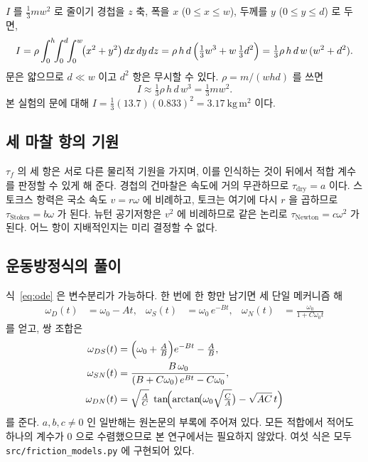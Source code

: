 \documentclass[11pt,letterpaper]{article}
\begin{document}
\begin{equationbreakdown}{$I$ 를 $\tfrac{1}{3}mw^2$ 로 줄이기}
경첩을 $z$ 축, 폭을 $x$ ($0\le x\le w$), 두께를 $y$ ($0\le y\le d$) 로 두면,
\begin{equation*}
I=\rho\int_0^h\!\!\int_0^d\!\!\int_0^w\!\bigl(x^2+y^2\bigr)\,dx\,dy\,dz
 =\rho\,h\,d\,\Bigl(\tfrac{1}{3}w^3+w\,\tfrac{1}{3}d^2\Bigr)
 =\tfrac13\rho\,h\,d\,w\,(w^2+d^2).
\end{equation*}
문은 얇으므로 $d\ll w$ 이고 $d^2$ 항은 무시할 수 있다. $\rho=m/(whd)$ 를 쓰면
\begin{equation*}
I\approx\tfrac13\rho\,h\,d\,w^3=\tfrac13 mw^2.
\end{equation*}
본 실험의 문에 대해 $I=\tfrac13(13.7)(0.833)^2=3.17~\mathrm{kg\,m^2}$ 이다.
\end{equationbreakdown}

\subsection{세 마찰 항의 기원}
$\tau_f$ 의 세 항은 서로 다른 물리적 기원을 가지며, 이를 인식하는 것이 뒤에서 적합 계수를
판정할 수 있게 해 준다. 경첩의 건마찰은 속도에 거의 무관하므로 $\tau_{\mathrm{dry}}=a$
이다. 스토크스 항력은 국소 속도 $v=r\omega$ 에 비례하고, 토크는 여기에 다시 $r$ 을 곱하므로
$\tau_{\mathrm{Stokes}}=b\omega$ 가 된다. 뉴턴 공기저항은 $v^2$ 에 비례하므로 같은 논리로
$\tau_{\mathrm{Newton}}=c\omega^2$ 가 된다. 어느 항이 지배적인지는 미리 결정할 수 없다.

\subsection{운동방정식의 풀이}
식~\eqref{eq:ode} 은 변수분리가 가능하다. 한 번에 한 항만 남기면 세 단일 메커니즘 해
\begin{align}
\omega_{D}(t) &= \omega_0 - A t,
&\omega_{S}(t) &= \omega_0\,e^{-Bt},
&\omega_{N}(t) &= \frac{\omega_0}{1+C\omega_0 t}
\end{align}
를 얻고, 쌍 조합은
\begin{align}
\omega_{DS}(t) &= \Bigl(\omega_0+\tfrac{A}{B}\Bigr)e^{-Bt}-\tfrac{A}{B}, \\
\omega_{SN}(t) &= \frac{B\,\omega_0}{(B+C\omega_0)\,e^{Bt}-C\omega_0}, \\
\omega_{DN}(t) &= \sqrt{\tfrac{A}{C}}\;
   \tan\!\Bigl(\arctan\!\bigl(\omega_0\sqrt{\tfrac{C}{A}}\bigr)-\sqrt{AC}\,t\Bigr)
\end{align}
를 준다. $a,b,c\neq0$ 인 일반해는 원논문의 부록에 주어져 있다. 모든 적합에서 적어도 하나의
계수가 0 으로 수렴했으므로 본 연구에서는 필요하지 않았다. 여섯 식은 모두
\texttt{src/friction\_models.py} 에 구현되어 있다.
\end{document}
